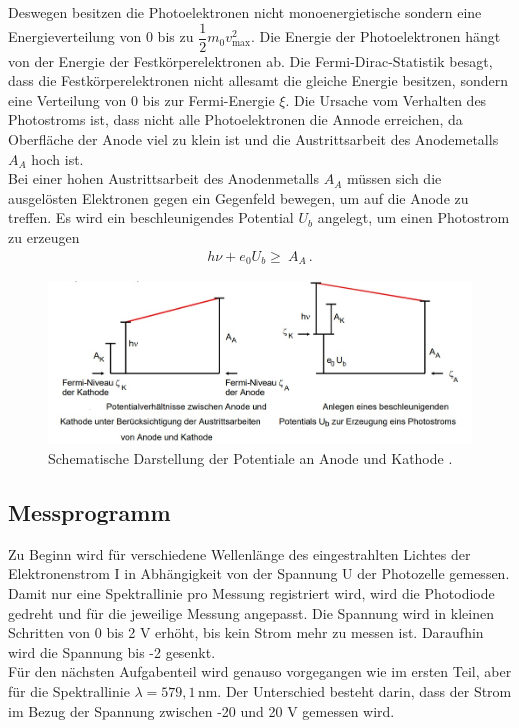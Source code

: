 \noindent 
Deswegen besitzen die Photoelektronen nicht monoenergietische sondern eine Energieverteilung von 0 bis zu \(\dfrac{1}{2} m_0 v_{\text{max}}^2\).
Die Energie der Photoelektronen hängt von der Energie der Festkörperelektronen ab. Die Fermi-Dirac-Statistik  besagt,  
dass die Festkörperelektronen nicht allesamt die gleiche Energie besitzen, 
sondern eine Verteilung von 0 bis zur Fermi-Energie $\xi$.
Die Ursache vom Verhalten des Photostroms ist, dass nicht alle Photoelektronen die Annode erreichen, 
da Oberfläche der Anode viel zu klein ist und die Austrittsarbeit des Anodemetalls $A_A$ hoch ist.\\
Bei einer hohen Austrittsarbeit des Anodenmetalls $A_A$ müssen sich die ausgelösten Elektronen
gegen ein Gegenfeld bewegen, um auf die Anode zu treffen. Es wird ein beschleunigendes
Potential $U_b$ angelegt, um einen Photostrom zu erzeugen
\begin{align}
    h \nu + e_0 U_b \geq \ A_A \,.
\end{align}
\begin{figure}[H]
    \centering
    \includegraphics[width=1\textwidth]{Gegenfeld.jpg}
    \caption{Schematische Darstellung der Potentiale an Anode und Kathode \cite{1}.}
    \label{fig:Gegenfeld}
\end{figure}
\noindent 


\subsection{Messprogramm}
Zu Beginn wird  für verschiedene Wellenlänge des eingestrahlten Lichtes der
Elektronenstrom I in Abhängigkeit von der Spannung U der Photozelle gemessen. Damit
nur eine Spektrallinie pro Messung registriert wird, wird die Photodiode gedreht
und für die jeweilige Messung angepasst. Die Spannung wird in kleinen Schritten von 0
bis 2 V erhöht, bis kein Strom mehr zu messen ist. Daraufhin wird die Spannung bis -2
gesenkt.\\
Für den nächsten Aufgabenteil wird genauso vorgegangen wie im ersten Teil, aber für die Spektrallinie \(\lambda=579,1 \,\text{nm} \). 
Der Unterschied besteht darin, dass der Strom im Bezug der Spannung zwischen -20 und 20 V gemessen wird.\\
\label{sec:Durchführung}
